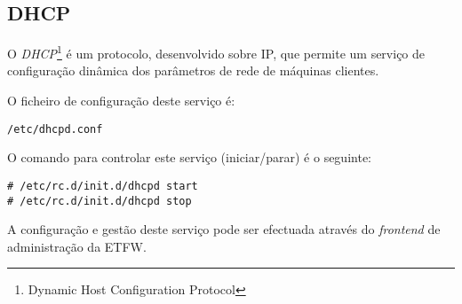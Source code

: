 \subsection{DHCP}

O \emph{DHCP}\footnote{Dynamic Host Configuration Protocol} é um protocolo,
desenvolvido sobre IP, que permite um serviço de configuração dinâmica 
dos parâmetros de rede de máquinas clientes.

O ficheiro de configuração deste serviço é:

\begin{Verbatim}[commandchars=\\\{\}]
/etc/dhcpd.conf
\end{Verbatim}

O comando para controlar este serviço (iniciar/parar) é o seguinte:

\begin{Verbatim}[commandchars=\\\{\}]
# /etc/rc.d/init.d/dhcpd start
# /etc/rc.d/init.d/dhcpd stop
\end{Verbatim}

A configuração e gestão deste serviço pode ser efectuada através do \textit{frontend} de administração da ETFW.
